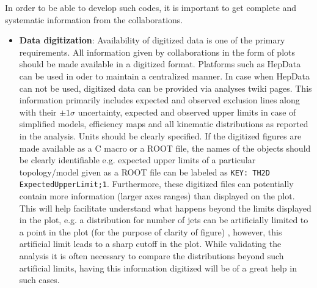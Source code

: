 In order to be able to develop such codes, it is important to get complete and systematic information from the collaborations. 
\begin{itemize}
	\item	\textbf{Data digitization}: Availability of digitized data is one of the primary requirements. All information given by collaborations in the form of plots should be made available in a digitized format. Platforms such as HepData can be used in oder to maintain a centralized manner. In case when HepData can not be used, digitized data can be provided via analyses twiki pages. This information primarily includes expected and observed exclusion lines along with their $\pm 1 \sigma$ uncertainty, expected and observed upper limits in case of simplified models, efficiency maps and all kinematic distributions as reported in the analysis. Units should be clearly specified. If the digitized figures are made available as a C macro or a ROOT file, the names of the objects should be clearly identifiable e.g. expected upper limits of a particular topology/model given  as a ROOT file can be labeled as \texttt{KEY: TH2D	ExpectedUpperLimit;1}. Furthermore, these digitized files can potentially contain more information (larger axes ranges) than displayed on the plot. This will help facilitate understand what happens beyond the limits displayed in the plot, e.g. a distribution for number of jets can be artificially limited to a point in the plot (for the purpose of clarity of figure) , however, this artificial limit leads to a sharp cutoff in the plot. While validating the analysis it is often necessary to compare the distributions beyond such artificial limits, having this information digitized will be of a great help in such cases. 
\end{itemize}

